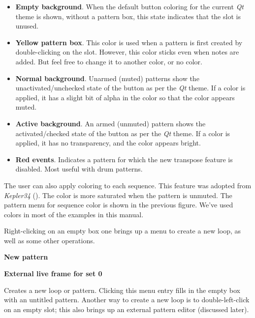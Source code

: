    \begin{itemize}
      \item \textbf{Empty background}.  When the default button coloring for
         the current \textsl{Qt} theme is shown, without a pattern box,
         this state indicates that the slot is unused.
      \item \textbf{Yellow pattern box}. This color is used when a pattern is
         first created by double-clicking on the slot.
         However, this color sticks even when notes are added.
         But feel free to change it to another color, or no color.
      \item \textbf{Normal background}.  Unarmed (muted) patterns show the
         unactivated/unchecked state of the button as per the \textsl{Qt}
         theme.  If a color is applied, it has a slight bit of alpha in the
         color so that the color appears muted.
      \item \textbf{Active background}.  An armed (unmuted) pattern shows the
         activated/checked state of the button as per the \textsl{Qt}
         theme.  If a color is applied, it has no transparency, and the 
         color appears bright.
      \item \textbf{Red events}.
         Indicates a pattern for which the new transpose feature is
         disabled.  Most useful with drum patterns.
   \end{itemize}

   The user can also apply coloring to each sequence.
   This feature was adopted from \textsl{Kepler34} (\cite{kepler34}).
   The color is more saturated when the pattern is unmuted.
   The pattern menu for sequence color is shown in the previous figure.
   We've used colors in most of the examples in this manual.

   Right-clicking on an empty box one brings up a menu to create
   a new loop, as well as some other operations.

   \begin{enumber}
      \item \textbf{New pattern}
      \item \textbf{External live frame for set 0}
   \end{enumber}

   \setcounter{ItemCounter}{0}      %

   Creates a new loop or pattern.
   Clicking this menu entry fills in the empty box with an untitled
   pattern.  Another way to create a new loop is to double-left-click on an
   empty slot; this also brings up an external pattern editor (discussed
   later).

